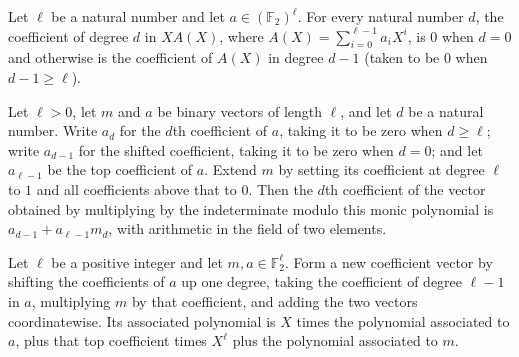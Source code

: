 \begin{theorem}
\label{FABL.binaryShiftUpCoefficient_eq_coeff_X_mul}
\leanok
{}
Let $\ell$ be a natural number and let $a\in(\mathbb{F}_2)^\ell$. For every natural
number $d$, the coefficient of degree $d$ in $X A(X)$, where
$A(X)=\sum_{i=0}^{\ell-1}a_iX^i$, is $0$ when $d=0$ and otherwise is the coefficient of
$A(X)$ in degree $d-1$ (taken to be $0$ when $d-1\ge\ell$).
\end{theorem}

\begin{theorem}
\label{FABL.binaryCoefficientAt_binaryXMulMod}
\leanok
{}
Let $\ell>0$, let $m$ and $a$ be binary vectors of length $\ell$, and let $d$ be a natural
number. Write $a_d$ for the $d$th coefficient of $a$, taking it to be zero when $d\ge
\ell$; write $a_{d-1}$ for the shifted coefficient, taking it to be zero when $d=0$; and
let $a_{\ell-1}$ be the top coefficient of $a$. Extend $m$ by setting its coefficient at
degree $\ell$ to $1$ and all coefficients above that to $0$. Then the $d$th coefficient of
the vector obtained by multiplying by the indeterminate modulo this monic polynomial is
$a_{d-1}+a_{\ell-1}m_d$, with arithmetic in the field of two elements.
\end{theorem}

\begin{theorem}
\label{FABL.binaryLowPolynomial_binaryXMulMod}
\leanok
{}
Let $\ell$ be a positive integer and let $m,a\in\mathbb F_2^\ell$. Form a new
coefficient vector by shifting the coefficients of $a$ up one degree, taking the
coefficient of degree $\ell-1$ in $a$, multiplying $m$ by that coefficient, and adding
the two vectors coordinatewise. Its associated polynomial is $X$ times the polynomial
associated to $a$, plus that top coefficient times $X^\ell$ plus the polynomial
associated to $m$.
\end{theorem}

